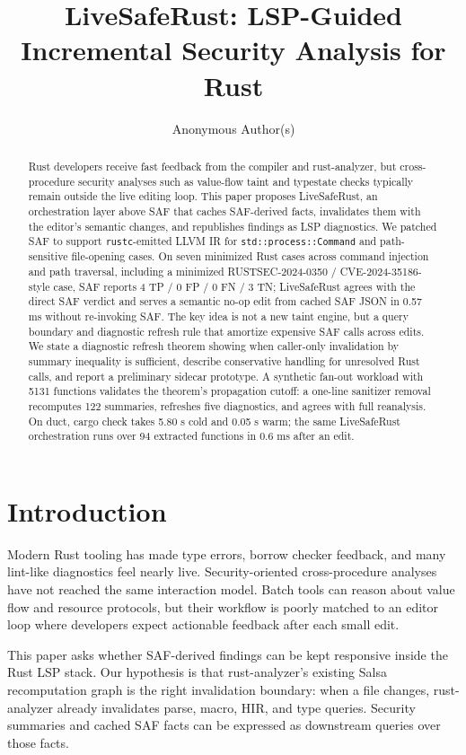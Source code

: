 \documentclass[sigconf,nonacm]{acmart}
\title{LiveSafeRust: LSP-Guided Incremental Security Analysis for Rust}
\author{Anonymous Author(s)}
\affiliation{\institution{Anonymous Institution}\country{}}
\begin{document}
\begin{abstract}
Rust developers receive fast feedback from the compiler and rust-analyzer, but
cross-procedure security analyses such as value-flow taint and typestate checks
typically remain outside the live editing loop. This paper proposes
LiveSafeRust, an orchestration layer above SAF that caches SAF-derived facts,
invalidates them with the editor's semantic changes, and republishes findings as
LSP diagnostics. We patched SAF to support \texttt{rustc}-emitted LLVM IR for
\texttt{std::process::Command} and path-sensitive file-opening cases. On seven
minimized Rust cases across command injection and path traversal, including a
minimized RUSTSEC-2024-0350 / CVE-2024-35186-style case, SAF reports 4 TP / 0 FP
/ 0 FN / 3 TN; LiveSafeRust agrees with the direct SAF verdict and serves a
semantic no-op edit from cached SAF JSON in 0.57 ms without re-invoking SAF. The
key idea is not a new taint engine, but a query boundary and diagnostic refresh
rule that amortize expensive SAF calls across edits. We state a diagnostic
refresh theorem showing when caller-only invalidation by summary inequality is
sufficient, describe conservative handling for unresolved Rust calls, and report
a preliminary sidecar prototype. A synthetic fan-out workload with 5131
functions validates the theorem's propagation cutoff: a one-line sanitizer
removal recomputes 122 summaries, refreshes five diagnostics, and agrees with
full reanalysis. On duct, cargo check takes 5.80 s cold and 0.05 s warm; the
same LiveSafeRust orchestration runs over 94 extracted functions in 0.6 ms after
an edit.
\end{abstract}

\maketitle

\section{Introduction}

Modern Rust tooling has made type errors, borrow checker feedback, and many
lint-like diagnostics feel nearly live. Security-oriented cross-procedure
analyses have not reached the same interaction model. Batch tools can reason
about value flow and resource protocols, but their workflow is poorly matched
to an editor loop where developers expect actionable feedback after each small
edit.

This paper asks whether SAF-derived findings can be kept responsive inside the
Rust LSP stack. Our hypothesis is that rust-analyzer's existing Salsa
recomputation graph is the right invalidation boundary: when a file changes,
rust-analyzer already invalidates parse, macro, HIR, and type queries. Security
summaries and cached SAF facts can be expressed as downstream queries over those
facts.
\end{document}
